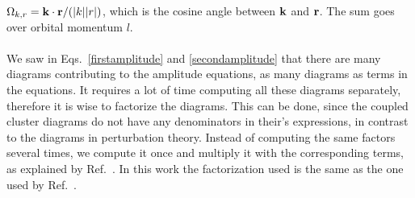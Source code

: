 $\Omega_{k,r}=\bold k\cdot \bold r/(|k||r|)$, which is the cosine angle between $\bold k$ and $\bold r$. The sum goes over orbital momentum $l$.\\ 
\\
We saw in Eqs.~\eqref{firstamplitude} and \eqref{secondamplitude} that there
are many diagrams contributing to the amplitude equations, as many diagrams
as terms in the equations. It requires a lot of time computing all these
diagrams separately, therefore it is wise to 
factorize the diagrams. This can be done, since the coupled cluster diagrams do not have any denominators in their's expressions,
in contrast to the diagrams in perturbation theory. 
Instead of computing the same factors several times, we compute it once and
multiply it with the corresponding terms, as explained by Ref.~\cite{bartlett:291}. In this work the factorization used is the same as the one used by Ref.~\cite{hagen:034302}.

